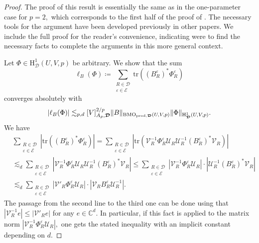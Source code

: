 \documentclass{article}
\theoremstyle{definition}
\theoremstyle{remark}
\numberwithin{equation}{section}
\newcommand{\cE}{\mathcal{E}}
\newcommand{\cU}{\mathcal{U}}
\newcommand{\cV}{\mathcal{V}}
\newcommand{\bfD}{\bm{\mathcal{D}}}
\newcommand{\e}{\varepsilon}
\newcommand{\complex}{\mathbb{C}}
\newcommand{\1}{\mathbf{1}}
\newcommand{\tr}{\mathrm{tr}}
\newcommand{\BMOprodD}{\ensuremath\text{BMO}_{\text{prod},\bfD}}
\begin{document}
    \begin{proof}
        The proof of this result is essentially the same as in
        the one-parameter case for $p = 2,$
        which corresponds to the first half of the proof of \cite[Theorem 1.3]{Isralowitz_2017}.
        The necessary tools for the argument have been developed previously in other papers.
        We include the full proof for the reader's convenience,
        indicating were to find the necessary facts to complete the arguments
        in this more general context.
        
        Let $\Phi\in \mathrm{H}^1_{\bfD}(U,V,p)$ be arbitrary. We show that the sum
        \begin{equation*}
            \ell_{B}(\Phi)\coloneq \sum_{\substack{R\in\bfD\\\e\in\cE}}\tr((B_{R}^{\e})^{\ast}\Phi_{R}^{\e})
        \end{equation*}
        converges absolutely with
        \begin{equation*}
            |\ell_{B}(\Phi)|\lesssim_{p,d}[V]_{A_p,\bfD}^{2/p}\Vert B\Vert_{\BMOprodD(U,V,p)}\Vert\Phi\Vert_{\mathrm{H}^1_{\bfD}(U,V,p)}.
        \end{equation*}
        We have
        \begin{align*}
            &\sum_{\substack{R\in\bfD\\\e\in\cE}}|\tr((B_{R}^{\e})^{\ast}\Phi_{R}^{\e})|
            =\sum_{\substack{R\in\bfD\\\e\in\cE}}|\tr(\cV_{R}^{-1}\Phi_{R}^{\e}\cU_{R}\cU_{R}^{-1}(B_{R}^{\e})^{\ast}\cV_{R})|\\
            &\lesssim_{d}\sum_{\substack{R\in\bfD\\\e\in\cE}}|\cV_{R}^{-1}\Phi_{R}^{\e}\cU_{R}\cU_{R}^{-1}(B_{R}^{\e})^{\ast}\cV_{R}|
            \leq\sum_{\substack{R\in\bfD\\\e\in\cE}}|\cV_{R}^{-1}\Phi_{R}^{\e}\cU_{R}|\cdot|\cU_{R}^{-1}(B_{R}^{\e})^{\ast}\cV_{R}|\\
            &\lesssim_{d}\sum_{\substack{R\in\bfD\\\e\in\cE}}|\cV'_{R}\Phi_{R}^{\e}\cU_{R}|\cdot|\cV_{R}B_{R}^{\e}\cU_{R}^{-1}|.
        \end{align*}
        The passage from the second line to the third one can be done using that
        $|\cV^{-1}_R e| \leq  |\cV'_R e|$ for any $e \in \complex^d.$
        In particular, if this fact is applied to the matrix norm $|\cV_{R}^{-1}\Phi_{R}^{\e}\cU_{R}|,$ one gets the stated inequality with an implicit constant depending on $d.$

\end{proof}
\end{document}
